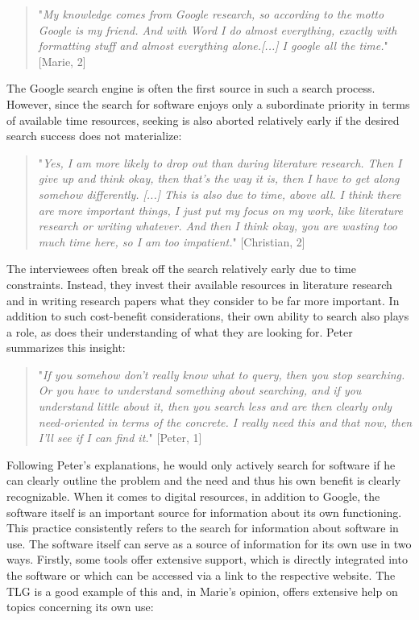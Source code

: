 \documentclass[12pt, a4paper, titlepage, oneside, abstract=true, toc=listof, toc=bibliography]{scrreprt}
\begin{document}
{\begin{quotation}
"\textit{My knowledge comes from Google research, so according to the motto Google is my friend. And with Word I do almost everything, exactly with formatting stuff and almost everything alone.[...] I google all the time.}" [Marie, 2]
\end{quotation}

The Google search engine is often the first source in such a search process. However, since the search for software enjoys only a subordinate priority in terms of available time resources, seeking is also aborted relatively early if the desired search success does not materialize:

\begin{quotation}
"\textit{Yes, I am more likely to drop out than during literature research. Then I give up and think okay, then that's the way it is, then I have to get along somehow differently. [...] This is also due to time, above all. I think there are more important things, I just put my focus on my work, like literature research or writing whatever. And then I think okay, you are wasting too much time here, so I am too impatient.}" [Christian, 2]
\end{quotation}

The interviewees often break off the search relatively early due to time constraints. Instead, they invest their available resources in literature research and in writing research papers what they consider to be far more important. In addition to such cost-benefit considerations, their own ability to search also plays a role, as does their understanding of what they are looking for. Peter summarizes this insight:

\begin{quotation}
"\textit{If you somehow don't really know what to query, then you stop searching. Or you have to understand something about searching, and if you understand little about it, then you search less and are then clearly only need-oriented in terms of the concrete. I really need this and that now, then I'll see if I can find it.}" [Peter, 1]
\end{quotation}

Following Peter's explanations, he would only actively search for software if he can clearly outline the problem and the need and thus his own benefit is clearly recognizable.
When it comes to digital resources, in addition to Google, the software itself is an important source for information about its own functioning. This practice consistently refers to the search for information about software in use.
The software itself can serve as a source of information for its own use in two ways. Firstly, some tools offer extensive support, which is directly integrated into the software or which can be accessed via a link to the respective website. The TLG is a good example of this and, in Marie's opinion, offers extensive help on topics concerning its own use:

}
\end{document}
